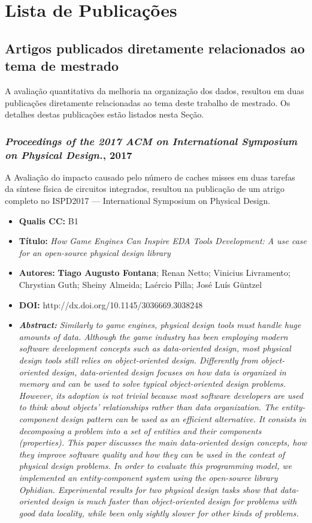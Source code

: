 \chapter{Lista de Publicações}
\label{ap:producoes}
\section{Artigos publicados diretamente relacionados ao tema de mestrado}

A avaliação quantitativa da melhoria na organização dos dados, resultou em duas publicações diretamente relacionadas ao tema deste trabalho de mestrado. Os detalhes destas publicações estão listados nesta Seção.

\subsection{\textit{Proceedings of the 2017 ACM on International Symposium on Physical Design.}, 2017}

A Avaliação do impacto causado pelo número de caches misses em duas tarefas da síntese física de circuitos integrados, resultou na publicação de um atrigo completo no ISPD2017 --- International Symposium on Physical Design.

\begin{itemize}
\item \textbf{Qualis CC:} B1
\item \textbf{Título:} \textit{How Game Engines Can Inspire EDA Tools Development: A use case for an open-source physical design library}
\item \textbf{Autores:}  \textbf{Tiago Augusto Fontana}; Renan Netto; Vinicius Livramento; Chrystian Guth; Sheiny Almeida; Laércio Pilla; José Luís Güntzel
\item \textbf{DOI:} http://dx.doi.org/10.1145/3036669.3038248
\item \textbf{\textit{Abstract:}} \emph{Similarly to game engines, physical design tools must handle huge amounts of data. Although the game industry has been employing modern software development concepts such as data-oriented design, most physical design tools still relies on object-oriented design. Differently from object-oriented design, data-oriented design focuses on how data is organized in memory and can be used to solve typical object-oriented design problems. However, its adoption is not trivial because most software developers are used to think about objects' relationships rather than data organization. The entity-component design pattern can be used as an efficient alternative. It consists in decomposing a problem into a set of entities and their components (properties). This paper discusses the main data-oriented design concepts, how they improve software quality and how they can be used in the context of physical design problems. In order to evaluate this programming model, we implemented an entity-component system using the open-source library Ophidian. Experimental results for two physical design tasks show that data-oriented design is much faster than object-oriented design for problems with good data locality, while been only sightly slower for other kinds of problems.}
\end{itemize}


